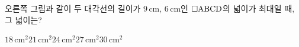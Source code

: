 \noindent\begin{minipage}[t]{0.58\linewidth}\vspace{0pt}\raggedright 오른쪽 그림과 같이 두 대각선의 길이가 $9\,\mathrm{cm}$, $6\,\mathrm{cm}$인 $\square\mathrm{ABCD}$의 넓이가 최대일 때, 그 넓이는?\end{minipage}\hfill\begin{minipage}[t]{0.4\linewidth}\vspace{0pt}\centering \resizebox{\ifdim\width>\linewidth\linewidth\else\width\fi}{!}{}\end{minipage}\par
\begin{choices32}{$18\,\mathrm{cm}^2$}{$21\,\mathrm{cm}^2$}{$24\,\mathrm{cm}^2$}{$27\,\mathrm{cm}^2$}{$30\,\mathrm{cm}^2$}\end{choices32}
